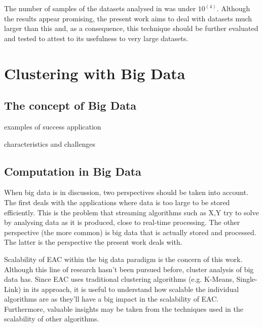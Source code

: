 The number of samples of the datasets analysed in \cite{Lourenco2010} was under $10^(4)$. Although the results appear promising, the present work aims to deal with datasets much larger than this and, as a consequence, this technique should be further evaluated and tested to attest to its usefulness to very large datasets.

\section{Clustering with Big Data}
\label{sec:big data}

\subsection{The concept of Big Data}

examples of success application

characteristics and challenges


\subsection{Computation in Big Data}
When big data is in discussion, two perspectives should be taken into account. The first deals with the applications where data is too large to be stored efficiently. This is the problem that streaming algorithms such as X,Y try to solve by analysing data as it is produced, close to real-time processing. %
The other perspective (the more common) is big data that is actually stored and processed. The latter is the perspective the present work deals with.

Scalability of EAC within the big data paradigm is the concern of this work. Although this line of research hasn't been pursued before, cluster analysis of big data has. %
Since EAC uses traditional clustering algorithms (e.g. K-Means, Single-Link) in its approach, it is useful to understand how scalable the individual algorithms are as they'll have a big impact in the scalability of EAC. Furthermore, valuable insights may be taken from the techniques used in the scalability of other algorithms.


